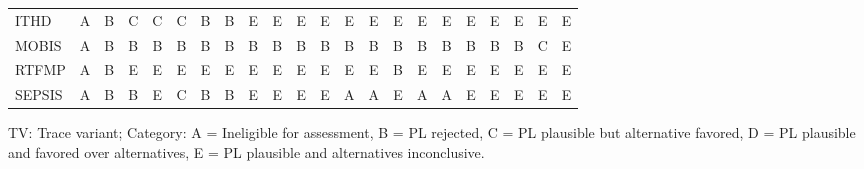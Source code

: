 {\begin{tabular}{lccccccccccccccccccccc}
ITHD & \cellcolor[HTML]{FFFFFF} A & \cellcolor[HTML]{EA4646} B & \cellcolor[HTML]{9670BD} C & \cellcolor[HTML]{9670BD} C & \cellcolor[HTML]{9670BD} C & \cellcolor[HTML]{EA4646} B & \cellcolor[HTML]{EA4646} B & \cellcolor[HTML]{19C8C8} E & \cellcolor[HTML]{19C8C8} E & \cellcolor[HTML]{19C8C8} E & \cellcolor[HTML]{19C8C8} E & \cellcolor[HTML]{19C8C8} E & \cellcolor[HTML]{19C8C8} E & \cellcolor[HTML]{19C8C8} E & \cellcolor[HTML]{19C8C8} E & \cellcolor[HTML]{19C8C8} E & \cellcolor[HTML]{19C8C8} E & \cellcolor[HTML]{19C8C8} E & \cellcolor[HTML]{19C8C8} E & \cellcolor[HTML]{19C8C8} E & \cellcolor[HTML]{19C8C8} E \\
MOBIS & \cellcolor[HTML]{FFFFFF} A & \cellcolor[HTML]{EA4646} B & \cellcolor[HTML]{EA4646} B & \cellcolor[HTML]{EA4646} B & \cellcolor[HTML]{EA4646} B & \cellcolor[HTML]{EA4646} B & \cellcolor[HTML]{EA4646} B & \cellcolor[HTML]{EA4646} B & \cellcolor[HTML]{EA4646} B & \cellcolor[HTML]{EA4646} B & \cellcolor[HTML]{EA4646} B & \cellcolor[HTML]{EA4646} B & \cellcolor[HTML]{EA4646} B & \cellcolor[HTML]{EA4646} B & \cellcolor[HTML]{EA4646} B & \cellcolor[HTML]{EA4646} B & \cellcolor[HTML]{EA4646} B & \cellcolor[HTML]{EA4646} B & \cellcolor[HTML]{EA4646} B & \cellcolor[HTML]{9670BD} C & \cellcolor[HTML]{19C8C8} E \\
RTFMP & \cellcolor[HTML]{FFFFFF} A & \cellcolor[HTML]{EA4646} B & \cellcolor[HTML]{19C8C8} E & \cellcolor[HTML]{19C8C8} E & \cellcolor[HTML]{19C8C8} E & \cellcolor[HTML]{19C8C8} E & \cellcolor[HTML]{19C8C8} E & \cellcolor[HTML]{19C8C8} E & \cellcolor[HTML]{19C8C8} E & \cellcolor[HTML]{19C8C8} E & \cellcolor[HTML]{19C8C8} E & \cellcolor[HTML]{19C8C8} E & \cellcolor[HTML]{19C8C8} E & \cellcolor[HTML]{EA4646} B & \cellcolor[HTML]{19C8C8} E & \cellcolor[HTML]{19C8C8} E & \cellcolor[HTML]{19C8C8} E & \cellcolor[HTML]{19C8C8} E & \cellcolor[HTML]{19C8C8} E & \cellcolor[HTML]{19C8C8} E & \cellcolor[HTML]{19C8C8} E \\
SEPSIS & \cellcolor[HTML]{FFFFFF} A & \cellcolor[HTML]{EA4646} B & \cellcolor[HTML]{EA4646} B & \cellcolor[HTML]{19C8C8} E & \cellcolor[HTML]{9670BD} C & \cellcolor[HTML]{EA4646} B & \cellcolor[HTML]{EA4646} B & \cellcolor[HTML]{19C8C8} E & \cellcolor[HTML]{19C8C8} E & \cellcolor[HTML]{19C8C8} E & \cellcolor[HTML]{19C8C8} E & \cellcolor[HTML]{FFFFFF} A & \cellcolor[HTML]{FFFFFF} A & \cellcolor[HTML]{19C8C8} E & \cellcolor[HTML]{FFFFFF} A & \cellcolor[HTML]{FFFFFF} A & \cellcolor[HTML]{19C8C8} E & \cellcolor[HTML]{19C8C8} E & \cellcolor[HTML]{19C8C8} E & \cellcolor[HTML]{19C8C8} E & \cellcolor[HTML]{19C8C8} E \\
\bottomrule
\end{tabular}
}
\begin{center}\footnotesize
TV: Trace variant; \quad Category: A = Ineligible for assessment, B = PL rejected, C = PL plausible but alternative favored, D = PL plausible and favored over alternatives, E = PL plausible and alternatives inconclusive.
\end{center}
